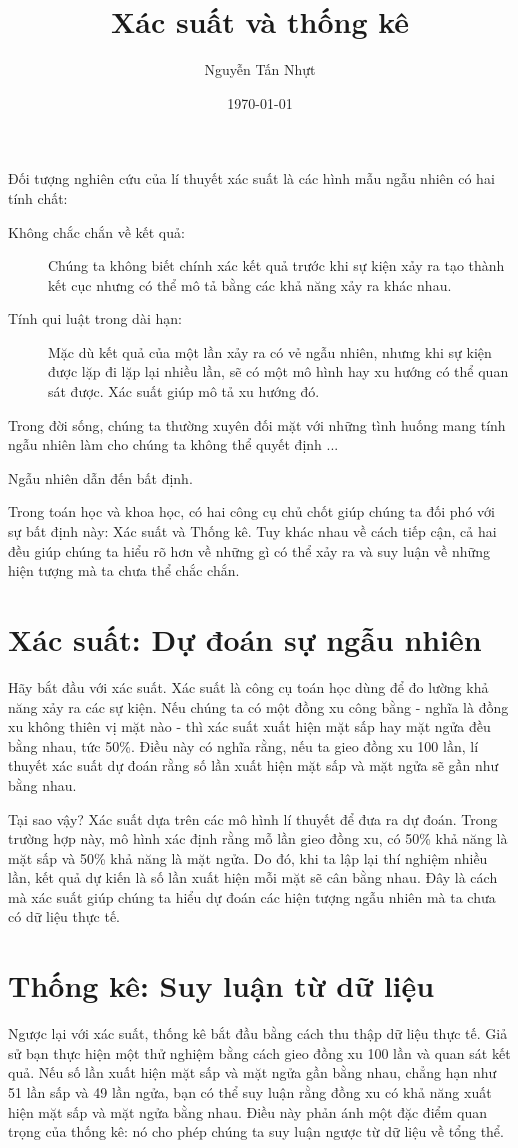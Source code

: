 \documentclass[12pt]{article} %
\title{Xác suất và thống kê}
\author{Nguyễn Tấn Nhựt}
\date{\today}
\begin{document}
\maketitle
Đối tượng nghiên cứu của lí thuyết xác suất là các hình mẫu ngẫu nhiên có hai tính chất:
\begin{description}
    \item [Không chắc chắn về kết quả:] Chúng ta không biết chính xác kết quả trước khi sự kiện xảy ra tạo thành kết cục nhưng có thể mô tả bằng các khả năng xảy ra khác nhau.
    \item [Tính qui luật trong dài hạn:] Mặc dù kết quả của một lần xảy ra có vẻ ngẫu nhiên, nhưng khi sự kiện được lặp đi lặp lại nhiều lần, sẽ có một mô hình hay xu hướng có thể quan sát được. Xác suất giúp mô tả xu hướng đó. 
\end{description}
Trong đời sống, chúng ta thường xuyên đối mặt với những tình huống mang tính ngẫu nhiên làm cho chúng ta không thể quyết định ... 

Ngẫu nhiên dẫn đến bất định. 

Trong toán học và khoa học, có hai công cụ chủ chốt giúp chúng ta đối phó với sự bất định này: Xác suất và Thống kê. Tuy khác nhau về cách tiếp cận, cả hai đều giúp chúng ta hiểu rõ hơn về những gì có thể xảy ra và suy luận về những hiện tượng mà ta chưa thể chắc chắn. 

\section{Xác suất: Dự đoán sự ngẫu nhiên}
Hãy bắt đầu với xác suất. Xác suất là công cụ toán học dùng để đo lường khả năng xảy ra các sự kiện. Nếu chúng ta có một đồng xu công bằng - nghĩa là đồng xu không thiên vị mặt nào - thì xác suất xuất hiện mặt sấp hay mặt ngửa đều bằng nhau, tức 50\%. Điều này có nghĩa rằng, nếu ta gieo đồng xu 100 lần, lí thuyết xác suất dự đoán rằng số lần xuất hiện mặt sấp và mặt ngửa sẽ gần như bằng nhau.

Tại sao vậy? Xác suất dựa trên các mô hình lí thuyết để đưa ra dự đoán. Trong trường hợp này, mô hình xác định rằng mỗ lần gieo đồng xu, có 50\% khả năng là mặt sấp và 50\% khả năng là mặt ngửa. Do đó, khi ta lập lại thí nghiệm nhiều lần, kết quả dự kiến là số lần xuất hiện mỗi mặt sẽ cân bằng nhau. Đây là cách mà xác suất giúp chúng ta hiểu dự đoán các hiện tượng ngẫu nhiên mà ta chưa có dữ liệu thực tế. 

\section{Thống kê: Suy luận từ dữ liệu}
Ngược lại với xác suất, thống kê bắt đầu bằng cách thu thập dữ liệu thực tế. Giả sử bạn thực hiện một thử nghiệm bằng cách gieo đồng xu 100 lần và quan sát kết quả. Nếu số lần xuất hiện mặt sấp và mặt ngửa gần bằng nhau, chẳng hạn như 51 lần sấp và 49 lần ngửa, bạn có thể suy luận rằng đồng xu có khả năng xuất hiện mặt sấp và mặt ngửa bằng nhau. Điều này phản ánh một đặc điểm quan trọng của thống kê: nó cho phép chúng ta suy luận ngược từ dữ liệu về tổng thể.
\end{document}
